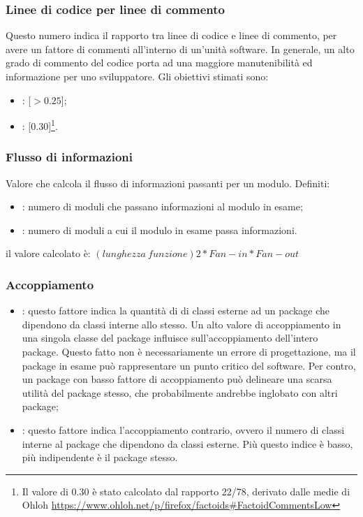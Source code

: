 \subsubsection{Linee di codice per linee di commento}
\label{4.2.5}
Questo numero indica il rapporto tra linee di codice e linee di commento, per avere un fattore di commenti all'interno di un'unità software. In generale, un alto grado di commento del codice porta ad una maggiore manutenibilità ed informazione per uno sviluppatore.
Gli obiettivi stimati sono:
\begin{itemize}
\item {}: [$>0.25$];
\item {}: [0.30]\footnote{Il valore di 0.30 è stato calcolato dal rapporto 22/78, derivato dalle medie di Ohloh \url{https://www.ohloh.net/p/firefox/factoids\#FactoidCommentsLow}}.
\end{itemize}

\subsubsection{Flusso di informazioni}
\label{4.2.6}
Valore che calcola il flusso di informazioni passanti per un modulo.
Definiti:
\begin{itemize}
\item {}: numero di moduli che passano informazioni al modulo in esame;
\item {}: numero di moduli a cui il modulo in esame passa informazioni.
\end{itemize}
il valore calcolato è:
\begin{math}(lunghezza\:funzione)2 * Fan-in * Fan-out\end{math}

\subsubsection{Accoppiamento}
\label{4.2.7}
\begin{itemize}
\item {}: questo fattore indica la quantità di di classi esterne ad un package che dipendono da classi interne allo stesso.
Un alto valore di accoppiamento in una singola classe del package influisce sull'accoppiamento dell'intero package. Questo fatto non è necessariamente un errore di progettazione, ma il package in esame può rappresentare un punto critico del software. Per contro, un package con basso fattore di accoppiamento può delineare una scarsa utilità del package stesso, che probabilmente andrebbe inglobato con altri package;
\item {}: questo fattore indica l'accoppiamento contrario, ovvero il numero di classi interne al package che dipendono da classi esterne. Più questo indice è basso, più indipendente è il package stesso.
\end{itemize}

